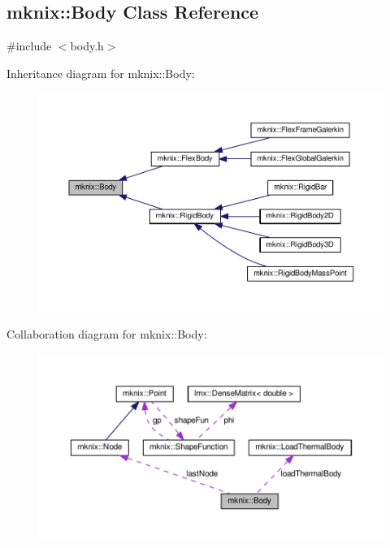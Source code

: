 \hypertarget{classmknix_1_1_body}{}\subsection{mknix\+:\+:Body Class Reference}
\label{classmknix_1_1_body}


{\ttfamily \#include $<$body.\+h$>$}



Inheritance diagram for mknix\+:\+:Body\+:\nopagebreak
\begin{figure}[H]
\begin{center}
\leavevmode
\includegraphics[width=350pt]{d9/d1c/classmknix_1_1_body__inherit__graph}
\end{center}
\end{figure}


Collaboration diagram for mknix\+:\+:Body\+:\nopagebreak
\begin{figure}[H]
\begin{center}
\leavevmode
\includegraphics[width=350pt]{d2/d93/classmknix_1_1_body__coll__graph}
\end{center}
\end{figure}
